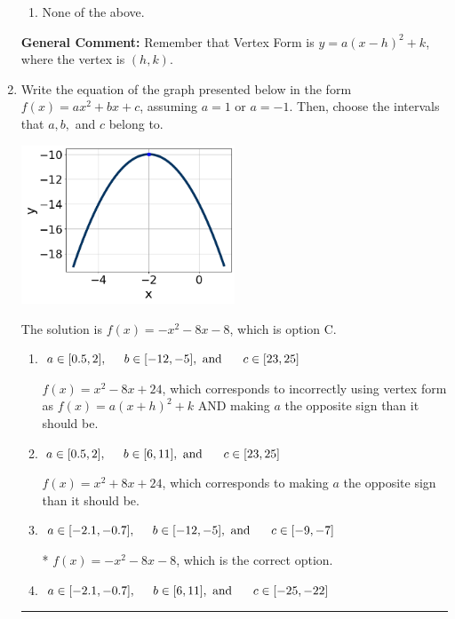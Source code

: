 \documentclass{extbook}[14pt]
\newcommand{\litem}[1]{\item #1

\rule{\textwidth}{0.4pt}}
\begin{document}
\begin{enumerate}
{\begin{enumerate}[label=\Alph*.]
\begin{multicols}{2}
\end{multicols}\item None of the above.\end{enumerate}
\textbf{General Comment:} Remember that Vertex Form is $y = a(x-h)^2+k$, where the vertex is $(h, k)$.
}
\litem{
Write the equation of the graph presented below in the form $f(x)=ax^2+bx+c$, assuming  $a=1$ or $a=-1$. Then, choose the intervals that $a, b,$ and $c$ belong to.

\begin{center}
    \includegraphics[width=0.5\textwidth]{../Figures/quadraticGraphToEquationA.png}
\end{center}


The solution is \( f(x) = -x^{2} -8 x -8 \), which is option C.\begin{enumerate}[label=\Alph*.]
\item \( a \in [0.5, 2], \hspace*{5mm} b \in [-12, -5], \text{ and } \hspace*{5mm} c \in [23, 25] \)

$f(x)=x^{2} -8 x + 24$, which corresponds to incorrectly using vertex form as $f(x) = a(x+h)^2+k$ AND making $a$ the opposite sign than it should be.
\item \( a \in [0.5, 2], \hspace*{5mm} b \in [6, 11], \text{ and } \hspace*{5mm} c \in [23, 25] \)

$f(x)=x^{2} +8 x + 24$, which corresponds to making $a$ the opposite sign than it should be.
\item \( a \in [-2.1, -0.7], \hspace*{5mm} b \in [-12, -5], \text{ and } \hspace*{5mm} c \in [-9, -7] \)

* $f(x)=-x^{2} -8 x -8$, which is the correct option.
\item \( a \in [-2.1, -0.7], \hspace*{5mm} b \in [6, 11], \text{ and } \hspace*{5mm} c \in [-25, -22] \)


\end{enumerate}}
\end{enumerate}
\end{document}
